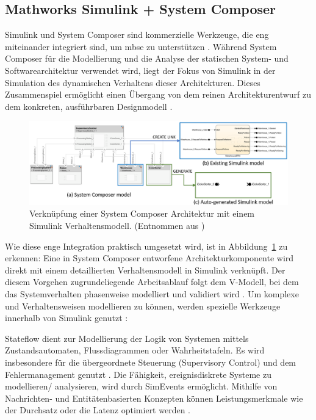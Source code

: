 \subsection{Mathworks Simulink + System Composer}
Simulink und System Composer sind kommerzielle Werkzeuge, die eng miteinander integriert sind, um \gls{mbse} zu unterstützen \cite{watkins2020system}.
Während System Composer für die Modellierung und die Analyse der statischen System- und Softwarearchitektur verwendet wird, liegt der Fokus von Simulink in der Simulation des dynamischen Verhaltens dieser Architekturen. Dieses Zusammenspiel ermöglicht einen Übergang von dem reinen Architekturentwurf zu dem konkreten, ausführbaren Designmodell \cite{chatterjee2020applications}.

\begin{figure}
  \centering
  \includegraphics[width=\textwidth]{figures/03StandDerTechnik/Simulink_System_Composer.png}
  \caption{Verknüpfung einer System Composer Architektur mit einem Simulink Verhaltensmodell. (Entnommen aus \cite{chatterjee2020applications})}
  \label{fig:simulink_system_composer}
\end{figure}

Wie diese enge Integration praktisch umgesetzt wird, ist in Abbildung~\ref{fig:simulink_system_composer} zu erkennen: Eine in System Composer entworfene Architekturkomponente wird direkt mit einem detaillierten Verhaltensmodell in Simulink verknüpft. Der diesem Vorgehen zugrundeliegende Arbeitsablauf folgt dem V-Modell, bei dem das Systemverhalten phasenweise modelliert und validiert wird \cite{themathworksinc.2025system}. Um komplexe und Verhaltensweisen modellieren zu können, werden spezielle Werkzeuge innerhalb von Simulink genutzt \cite{chatterjee2020applications}:

Stateflow dient zur Modellierung der Logik von Systemen mittels Zustandsautomaten, Flussdiagrammen oder Wahrheitstafeln. Es wird insbesondere für die übergeordnete Steuerung (Supervisory Control) und dem Fehlermanagement genutzt \cite{chatterjee2020applications}. Die Fähigkeit, ereignisdiskrete Systeme zu modellieren/ analysieren, wird durch SimEvents ermöglicht. Mithilfe von Nachrichten- und Entitätenbasierten Konzepten können Leistungsmerkmale wie der Durchsatz oder die Latenz optimiert werden \cite{chatterjee2020applications}.

